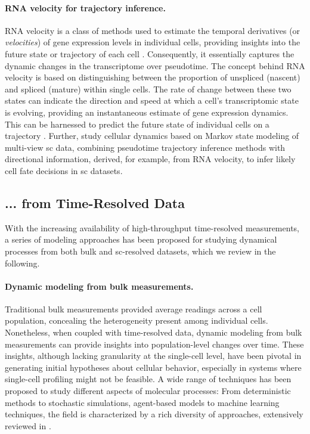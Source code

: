 \paragraph{RNA velocity for trajectory inference.}

\acrshort{RNA} velocity is a class of methods used to estimate the temporal derivatives (or \textit{velocities}) of gene expression levels in individual cells, providing insights into the future state or trajectory of each cell \citep{la2018rna}. Consequently, it essentially captures the dynamic changes in the transcriptome over pseudotime.
The concept behind \acrshort{RNA} velocity is based on distinguishing between the proportion of unspliced (nascent) and spliced (mature)  within single cells. The rate of change between these two states can indicate the direction and speed at which a cell's transcriptomic state is evolving, providing an instantaneous estimate of gene expression dynamics.
This can be harnessed to predict the future state of individual cells on a trajectory \citep{bergen2020generalizing}.
Further, \citet{lange2022cellrank} study cellular dynamics based on Markov state modeling of multi-view \acrlong{sc} data, combining pseudotime trajectory inference methods with directional information, derived, for example, from \acrshort{RNA} velocity, to infer likely cell fate decisions in \acrlong{sc} datasets.

\subsection*{... from Time-Resolved Data}

With the increasing availability of high-throughput time-resolved measurements, a series of modeling approaches has been proposed for studying dynamical processes from both bulk and \acrlong{sc}-resolved datasets, which we review in the following.

\paragraph{Dynamic modeling from bulk measurements.}

Traditional bulk measurements provided average readings across a cell population, concealing the heterogeneity present among individual cells. Nonetheless, when coupled with time-resolved data, dynamic modeling from bulk measurements can provide insights into population-level changes over time. These insights, although lacking granularity at the single-cell level, have been pivotal in generating initial hypotheses about cellular behavior, especially in systems where single-cell profiling might not be feasible. A wide range of techniques has been proposed to study different aspects of molecular processes: From deterministic methods to stochastic simulations, agent-based models to machine learning techniques, the field is characterized by a rich diversity of approaches, extensively reviewed in \citet{klipp2016systems}.

